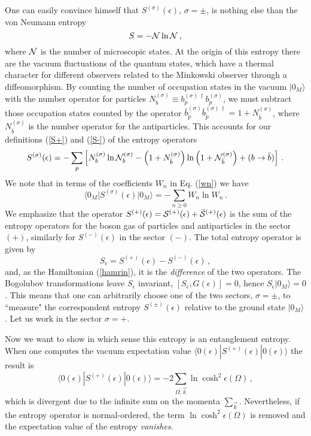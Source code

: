 \noindent One can easily convince himself that
$S^{(\sigma)}(\epsilon)$, $\sigma = \pm$, is nothing else than the
von Neumann entropy
 \begin{equation}\label{vonNeuE}
 S = - {\cal N} \ln {\cal N} \,,
 \end{equation}
where ${\cal N}$ is the number of microscopic states.  At the
origin of this entropy there are the vacuum fluctuations of the
quantum states, which have a thermal character for different
observers related to the Minkowski observer through a
diffeomorphism. By counting the number of occupation states in the
vacuum $|0_M\rangle$ with the number operator for particles
$N^{(\sigma)}_{b} \equiv b_p^{(\sigma) \,\dagger} b_p^{(\sigma)}$,
we must subtract those occupation states counted by the operator
$\bar{b}_{\tilde p}^{(\sigma)} \bar{b}_{\tilde p}^{(\sigma)\,
\dagger} = 1 + N^{(\sigma)}_{\bar{b}}$, where
$N^{(\sigma)}_{\bar{b}}$ is the number operator for the
antiparticles. This accounts for our definitions (\ref{S+}) and
(\ref{S-}) of the entropy operators
 \begin{equation} \label{23}
   S^{(\sigma)}(\epsilon) =  - \sum_p \left[N^{(\sigma)}_{b}
 \ln {\cal N}^{(\sigma)}_{b} - \left(1 + N^{(\sigma)}_{\bar b}\right) \ln \left(1 +
 {\cal N}^{(\sigma)}_{\bar{b}}\right)+ (b \to \bar{b})\right] \,.
 \end{equation}
We note that in terms of the coefficients $W_n$ in Eq. (\ref{wn})
we have
\[
\langle0_M\vert S^{(\sigma)}(\epsilon) \vert0_M\rangle = - \sum_{n
\geq 0} W_n \ln W_n \,.
\]
We emphasize that the operator $S^{(+)}(\epsilon) = {\cal
S}^{(+)}(\epsilon) + \bar{\cal S}^{(+)}(\epsilon)$ is the sum of
the entropy operators for the boson gas of particles and
antiparticles in the sector $(+)$, similarly for
$S^{(-)}(\epsilon)$ in the sector $(-)$. The total entropy
operator is given by
\begin{equation}\label{Stotale}
S_\epsilon = S^{(+)}(\epsilon) - S^{(-)}(\epsilon) \,,
\end{equation}
and, as the Hamiltonian (\ref{hamrin}), it is the {\it difference}
of the two operators. The Bogolubov transformations leave
$S_\epsilon$ invariant, $[S_\epsilon, G(\epsilon)]=0$, hence
$S_\epsilon |0_M\rangle = 0$. This means that one can arbitrarily
choose one of the two sectors, $\sigma = \pm $, to ``measure" the
correspondent entropy $S^{(\pm)}(\epsilon)$ relative to the ground
state $|0_M\rangle$. Let us work in the sector $\sigma = +$.

\noindent Now we want to show in which sense this entropy is an
entanglement entropy. When one computes the vacuum expectation
value $\langle 0(\epsilon)| S^{(+)}(\epsilon)|0(\epsilon)\rangle$
the result is
 \[
 \langle
0(\epsilon)| S^{(+)}(\epsilon)|0(\epsilon)\rangle =
-2\sum_{\Omega, \vec k} \ln \cosh^2\epsilon(\Omega) \,,
 \]
which is divergent due to the infinite sum on the momenta
$\sum_{\vec k}$. Nevertheless, if the entropy operator is
normal-ordered, the term $\ln \cosh^2\epsilon(\Omega)$ is removed
and the expectation value of the entropy {\it vanishes}.

